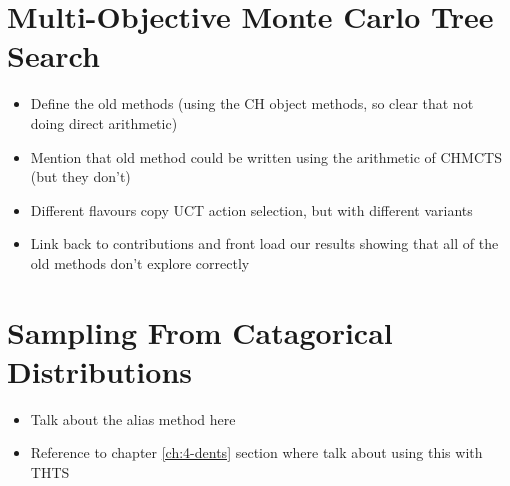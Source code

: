 



\section{Multi-Objective Monte Carlo Tree Search}
\label{sec:2-4-momcts}


    \begin{itemize}
        \item Define the old methods (using the CH object methods, so clear that not doing direct arithmetic)
        \item Mention that old method could be written using the arithmetic of CHMCTS (but they don't) 
        \item Different flavours copy UCT action selection, but with different variants
        \item Link back to contributions and front load our results showing that all of the old methods don't explore correctly
    \end{itemize}







\section{Sampling From Catagorical Distributions}
\label{sec:2-5-sampling}

    \begin{itemize}
        \item Talk about the alias method here
        \item Reference to chapter \ref{ch:4-dents} section where talk about using this with THTS
    \end{itemize}


